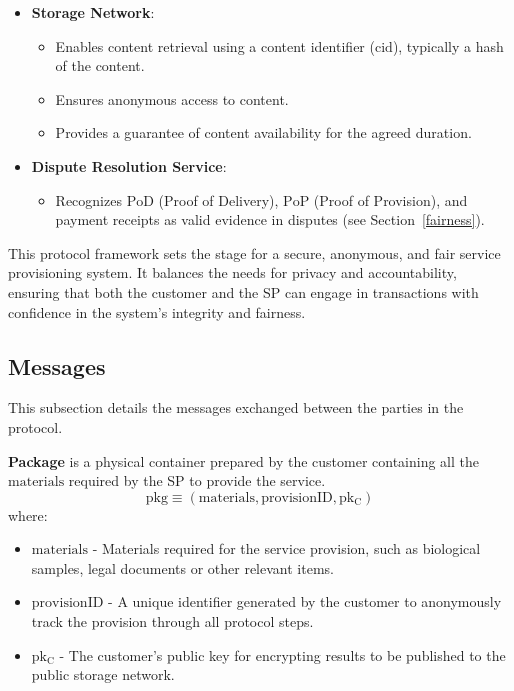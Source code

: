 \documentclass[pdftex,twocolumn,epjc3]{svjour3}
\begin{document}
\begin{itemize}
\item \textbf{Storage Network}:
    \begin{itemize}
        \item Enables content retrieval using a content identifier ($\mathrm{cid}$), typically a hash of the content.
        \item Ensures anonymous access to content.
        \item Provides a guarantee of content availability for the agreed duration.
    \end{itemize}
    
\item \textbf{Dispute Resolution Service}:
    \begin{itemize}
        \item Recognizes $\mathrm{PoD}$ (Proof of Delivery), $\mathrm{PoP}$ (Proof of Provision), and payment receipts as valid evidence in disputes (see Section~\ref{fairness}).
    \end{itemize}
\end{itemize}

\begin{sloppypar}
This protocol framework sets the stage for a secure, anonymous, and fair service provisioning system. It balances the needs for privacy and accountability, ensuring that both the customer and the SP can engage in transactions with confidence in the system's integrity and fairness.
\end{sloppypar}

\subsection{Messages}\label{messages}
This subsection details the messages exchanged between the parties in the protocol.

\vspace{5mm}

\noindent \textbf{Package}\label{package} is a physical container prepared by the customer containing all the $\mathrm{materials}$ required by the SP to provide the service.
\[\mathrm{pkg} \equiv (\mathrm{materials}, \mathrm{provisionID}, \mathrm{pk_C})\]
where:
\begin{itemize}
\item $\mathrm{materials}$ - Materials required for the service provision, such as biological samples, legal documents or other relevant items.
\item $\mathrm{provisionID}$ - A unique identifier generated by the customer to anonymously track the provision through all protocol steps.
\item $\mathrm{pk_C}$ - The customer's public key for encrypting results to be published to the public storage network.
\end{itemize}
\end{document}
